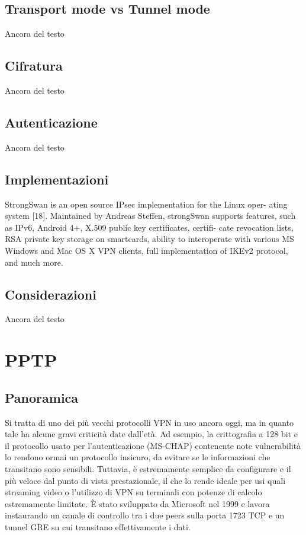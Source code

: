 \subsection{Transport mode vs Tunnel mode}
Ancora del testo

\subsection{Cifratura}
Ancora del testo

\subsection{Autenticazione}
Ancora del testo

\subsection{Implementazioni}
StrongSwan is an open source IPsec implementation for the Linux oper- ating system [18]. Maintained by Andreas Steffen, strongSwan supports features, such as IPv6, Android 4+, X.509 public key certificates, certifi- cate revocation lists, RSA private key storage on smartcards, ability to interoperate with various MS Windows and Mac OS X VPN clients, full implementation of IKEv2 protocol, and much more.

\subsection{Considerazioni}
Ancora del testo

\section{PPTP}
\subsection{Panoramica}
Si tratta di uno dei più vecchi protocolli VPN in uso ancora oggi, ma in quanto tale ha alcune gravi criticità date dall'età. Ad esempio, la crittografia a 128 bit e il protocollo usato per l'autenticazione (MS-CHAP) contenente note vulnerabilità lo rendono ormai un protocollo insicuro, da evitare se le informazioni che transitano sono sensibili.
Tuttavia, è estremamente semplice da configurare e il più veloce dal punto di vista prestazionale, il che lo rende ideale per usi quali streaming video o l'utilizzo di VPN su terminali con potenze di calcolo estremamente limitate.
È stato sviluppato da Microsoft nel 1999 \cite[RFC2637]{RFC2637} e lavora instaurando un canale di controllo tra i due peers sulla porta 1723 TCP e un tunnel GRE su cui transitano effettivamente i dati.

